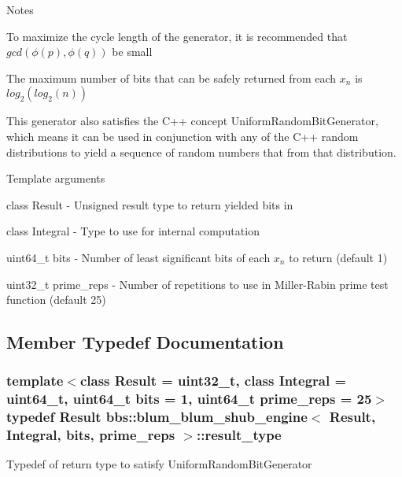 Notes
\begin{DoxyItemize}
\item To maximize the cycle length of the generator, it is recommended that $ gcd(\phi(p), \phi(q)) $ be small
\item The maximum number of bits that can be safely returned from each $ x_n $ is $ log_2(log_2(n)) $
\end{DoxyItemize}

This generator also satisfies the C++ concept Uniform\+Random\+Bit\+Generator, which means it can be used in conjunction with any of the C++ random distributions to yield a sequence of random numbers that from that distribution.

Template arguments
\begin{DoxyItemize}
\item class Result -\/ Unsigned result type to return yielded bits in
\item class Integral -\/ Type to use for internal computation
\item uint64\+\_\+t bits -\/ Number of least significant bits of each $ x_n $ to return (default 1)
\item uint32\+\_\+t prime\+\_\+reps -\/ Number of repetitions to use in Miller-\/\+Rabin prime test function (default 25) 
\end{DoxyItemize}

\subsection{Member Typedef Documentation}
\subsubsection[{\texorpdfstring{result\+\_\+type}{result_type}}]{\setlength{\rightskip}{0pt plus 5cm}template$<$class Result  = uint32\+\_\+t, class Integral  = uint64\+\_\+t, uint64\+\_\+t bits = 1, uint64\+\_\+t prime\+\_\+reps = 25$>$ typedef Result {\bf bbs\+::blum\+\_\+blum\+\_\+shub\+\_\+engine}$<$ Result, Integral, bits, prime\+\_\+reps $>$\+::{\bf result\+\_\+type}}\hypertarget{classbbs_1_1blum__blum__shub__engine_af8f60205a8a8b5cee055ed54d5739805}{}\label{classbbs_1_1blum__blum__shub__engine_af8f60205a8a8b5cee055ed54d5739805}
Typedef of return type to satisfy Uniform\+Random\+Bit\+Generator 

